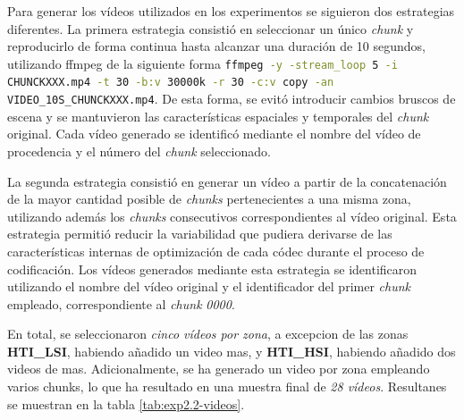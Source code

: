 Para generar los vídeos utilizados en los experimentos se siguieron dos estrategias diferentes. La primera estrategia consistió en seleccionar un único \textit{chunk} y reproducirlo de forma continua hasta alcanzar una duración de 10 segundos, utilizando ffmpeg de la siguiente forma \lstinline[language=sh,label={code:ffmpeg-loopvideo},caption={}]{ffmpeg -y -stream_loop 5 -i CHUNCKXXX.mp4 -t 30 -b:v 30000k -r 30 -c:v copy -an VIDEO_10S_CHUNCKXXX.mp4}. De esta forma, se evitó introducir cambios bruscos de escena y se mantuvieron las características espaciales y temporales del \textit{chunk} original. Cada vídeo generado se identificó mediante el nombre del vídeo de procedencia y el número del \textit{chunk} seleccionado.

La segunda estrategia consistió en generar un vídeo a partir de la concatenación de la mayor cantidad posible de \textit{chunks} pertenecientes a una misma zona, utilizando además los \textit{chunks} consecutivos correspondientes al vídeo original. Esta estrategia permitió reducir la variabilidad que pudiera derivarse de las características internas de optimización de cada códec durante el proceso de codificación. Los vídeos generados mediante esta estrategia se identificaron utilizando el nombre del vídeo original y el identificador del primer \textit{chunk} empleado, correspondiente al \textit{chunk} \textit{0000}.

En total, se seleccionaron \textit{cinco vídeos por zona}, a excepcion de las zonas \textbf{HTI\_LSI}, habiendo añadido un video mas, y \textbf{HTI\_HSI}, habiendo añadido dos videos de mas. Adicionalmente, se ha generado un video por zona empleando varios chunks, lo que ha resultado en una muestra final de \textit{28 vídeos}. Resultanes se muestran en la tabla \ref{tab:exp2.2-videos}.

